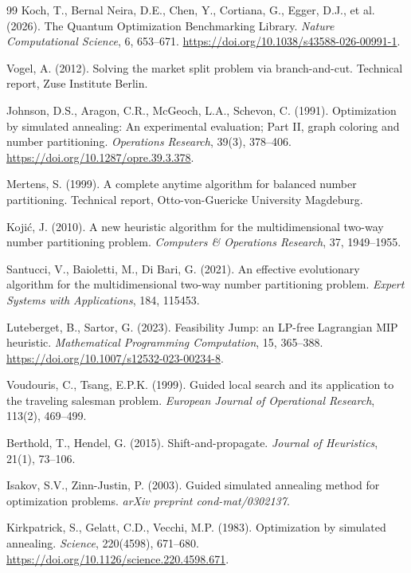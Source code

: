 \documentclass[11pt]{article}
\begin{document}
\begin{thebibliography}{99}
Koch, T., Bernal Neira, D.E., Chen, Y., Cortiana, G., Egger, D.J., et al. (2026).
The Quantum Optimization Benchmarking Library.
\emph{Nature Computational Science}, 6, 653--671.
\url{https://doi.org/10.1038/s43588-026-00991-1}.

Vogel, A. (2012).
Solving the market split problem via branch-and-cut.
Technical report, Zuse Institute Berlin.

Johnson, D.S., Aragon, C.R., McGeoch, L.A., Schevon, C. (1991).
Optimization by simulated annealing: An experimental evaluation; Part II, graph coloring and number partitioning.
\emph{Operations Research}, 39(3), 378--406.
\url{https://doi.org/10.1287/opre.39.3.378}.

Mertens, S. (1999).
A complete anytime algorithm for balanced number partitioning.
Technical report, Otto-von-Guericke University Magdeburg.

Koji\'c, J. (2010).
A new heuristic algorithm for the multidimensional two-way number partitioning problem.
\emph{Computers \& Operations Research}, 37, 1949--1955.

Santucci, V., Baioletti, M., Di Bari, G. (2021).
An effective evolutionary algorithm for the multidimensional two-way number partitioning problem.
\emph{Expert Systems with Applications}, 184, 115453.

Luteberget, B., Sartor, G. (2023).
Feasibility Jump: an LP-free Lagrangian MIP heuristic.
\emph{Mathematical Programming Computation}, 15, 365--388.
\url{https://doi.org/10.1007/s12532-023-00234-8}.

Voudouris, C., Tsang, E.P.K. (1999).
Guided local search and its application to the traveling salesman problem.
\emph{European Journal of Operational Research}, 113(2), 469--499.

Berthold, T., Hendel, G. (2015).
Shift-and-propagate.
\emph{Journal of Heuristics}, 21(1), 73--106.

Isakov, S.V., Zinn-Justin, P. (2003).
Guided simulated annealing method for optimization problems.
\emph{arXiv preprint cond-mat/0302137}.

Kirkpatrick, S., Gelatt, C.D., Vecchi, M.P. (1983).
Optimization by simulated annealing.
\emph{Science}, 220(4598), 671--680.
\url{https://doi.org/10.1126/science.220.4598.671}.

\end{thebibliography}
\end{document}
